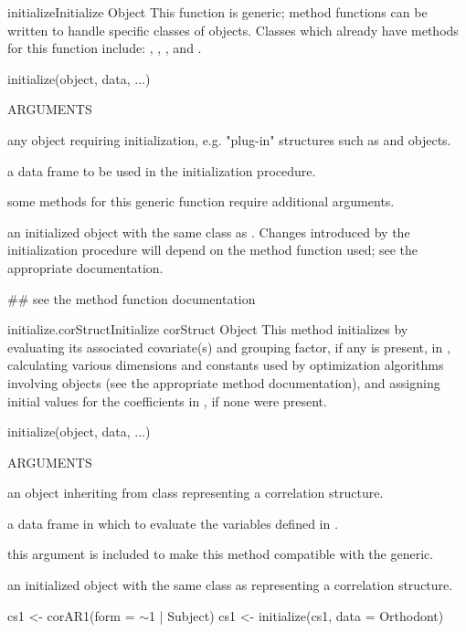 \documentclass[pdftex]{article} \usepackage{url,graphicx}
\renewcommand{\Twiddle}{\mbox{\(\sim\)}}
\begin{document}
\begin{Helpfile}{initialize}{Initialize Object}
This function is generic; method functions can be written to handle
specific classes of objects. Classes which already have methods for
this function include: , ,
, and .
\begin{Example}
initialize(object, data, ...)
\end{Example}
\begin{Argument}{ARGUMENTS}
\item[\Co{object:}]
any object requiring initialization, e.g. "plug-in"
structures such as  and  objects. 
\item[\Co{data:}]
a data frame to be used in the initialization procedure.
\item[\Co{...:}]
some methods for this generic function require additional
arguments.
\end{Argument}
an initialized object with the same class as . Changes
introduced by the initialization procedure will depend on the method
function used; see the appropriate documentation.
\need 15pt
\vspace{-16pt} 
\begin{Example}
## see the method function documentation
\end{Example}
\end{Helpfile}
\begin{Helpfile}{initialize.corStruct}{Initialize corStruct Object}
This method initializes  by evaluating its associated
covariate(s) and grouping factor, if any is present, in ,
calculating various dimensions and constants used by optimization
algorithms involving  objects (see the appropriate
 method documentation), and assigning initial values for
the coefficients in , if none were present.
\begin{Example}
initialize(object, data, ...)
\end{Example}
\begin{Argument}{ARGUMENTS}
\item[\Co{object:}]
an object inheriting from class 
representing a correlation structure.
\item[\Co{data:}]
a data frame in which to evaluate the variables defined in
.
\item[\Co{...:}]
this argument is included to make this method compatible
with the generic.
\end{Argument}
an initialized object with the same class as 
representing a correlation structure.
\need 15pt
\vspace{-16pt} 
\begin{Example}
cs1 <- corAR1(form = \Twiddle 1 | Subject)
cs1 <- initialize(cs1, data = Orthodont)
\end{Example}
\end{Helpfile}
\end{document}
